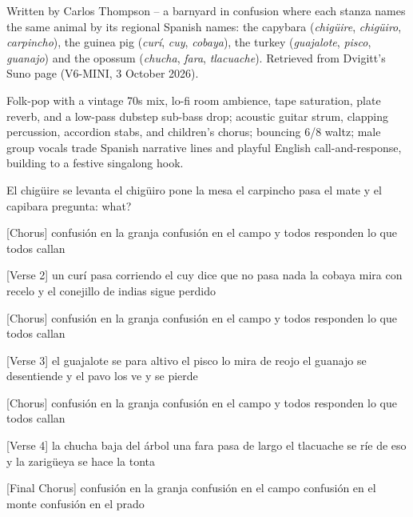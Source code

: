
\begin{notes}
Written by Carlos Thompson -- a barnyard in confusion where each stanza names the same animal by its regional Spanish names: the capybara (\emph{chigüire}, \emph{chigüiro}, \emph{carpincho}), the guinea pig (\emph{curí}, \emph{cuy}, \emph{cobaya}), the turkey (\emph{guajalote}, \emph{pisco}, \emph{guanajo}) and the opossum (\emph{chucha}, \emph{fara}, \emph{tlacuache}). Retrieved from Dvigitt's Suno page (V6-MINI, 3 October 2026).
\end{notes}
\begin{style}
Folk-pop with a vintage 70s mix, lo-fi room ambience, tape saturation, plate reverb, and a low-pass dubstep sub-bass drop; acoustic guitar strum, clapping percussion, accordion stabs, and children’s chorus; bouncing 6/8 waltz; male group vocals trade Spanish narrative lines and playful English call-and-response, building to a festive singalong hook.
\end{style}
\begin{lyrics}
[Verse 1]
El chigüire se levanta
el chigüiro pone la mesa
el carpincho pasa el mate
y el capibara pregunta: what?

[Chorus]
confusión en la granja
confusión en el campo
y todos responden
lo que todos callan

[Verse 2]
un curí pasa corriendo
el cuy dice que no pasa nada
la cobaya mira con recelo
y el conejillo de indias sigue perdido

[Chorus]
confusión en la granja
confusión en el campo
y todos responden
lo que todos callan

[Verse 3]
el guajalote se para altivo
el pisco lo mira de reojo
el guanajo se desentiende
y el pavo los ve y se pierde

[Chorus]
confusión en la granja
confusión en el campo
y todos responden
lo que todos callan

[Verse 4]
la chucha baja del árbol
una fara pasa de largo
el tlacuache se ríe de eso
y la zarigüeya se hace la tonta

[Final Chorus]
confusión en la granja
confusión en el campo
confusión en el monte
confusión en el prado
\end{lyrics}

